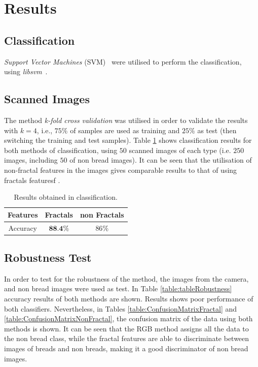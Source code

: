\documentclass[oneside,a4paper,english,links]{amca}
\begin{document}
\section{Results}

\subsection{Classification}
{\em Support Vector Machines} (SVM)~\cite{Boser92} were utilised to perform the classification, using {\em libsvm}~\cite{Chang2011}.


\subsection{Scanned Images}
The method {\em k-fold cross validation} was utilised in order to validate the results with $k = 4$, i.e., $75\%$ of samples are used as training and $25\%$ as test (then switching the training and test samples). Table \ref{table:tableFirstTest} shows classification results for both methods of classification, using $50$ scanned images of each type (i.e. $250$ images, including $50$ of non bread images). It can be seen that the utilisation of non-fractal features in the images gives comparable results to that of using fractals featuresf
.

\begin{table}[htb]
\centering
\begin{tabular}{|c|c|c|}
    \hline
    Features & Fractals & non Fractals\\
    \hline
    Accuracy  & $\textbf{88.4}\%$ & $86\%$\\
    \hline
\end{tabular}
\caption{Results obtained in classification. }
\label{table:tableFirstTest}
\end{table}

\subsection{Robustness Test}
In order to test for the robustness of the method, the images from the camera, and non bread images were used as test. In Table \ref{table:tableRobustness} accuracy results of both methods are shown. Results shows poor performance of both classifiers. Nevertheless, in Tables \ref{table:ConfusionMatrixFractal} and \ref{table:ConfusionMatrixNonFractal}, the confusion matrix of the data using both methods is shown. It can be seen that the RGB method assigns all the data to the non bread class, while the fractal features are able to discriminate between images of breads and non breads, making it a good discriminator of non bread images.
\end{document}
